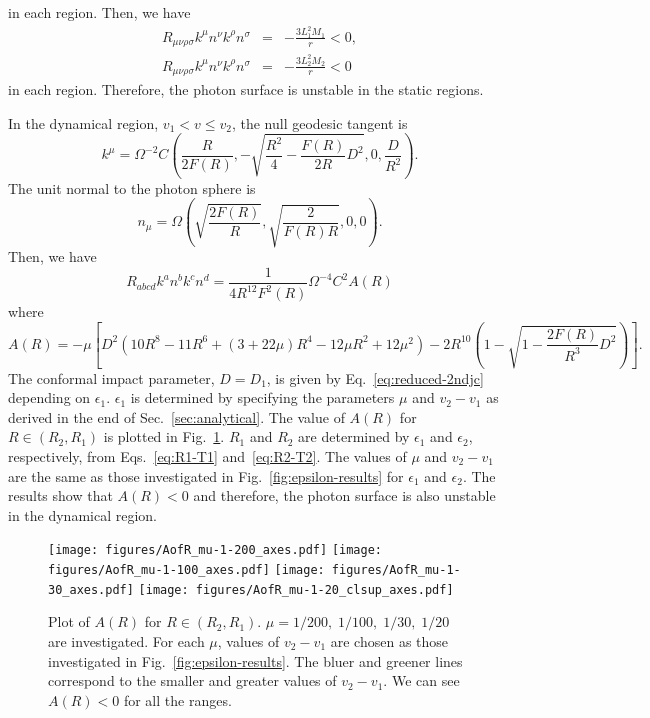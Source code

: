 \documentclass[prd,showpacs,preprintnumbers,groupedaddress,superscriptaddress,nofootinbib,11pt]{revtex4-1} %
\theoremstyle{newplain}
\begin{document}
in each region.
Then, we have
\begin{eqnarray}
R_{\mu\nu\rho\sigma}k^\mu n^\nu k^\rho n^\sigma&=&-\frac{3L_1^2M_1}{r}<0,\nonumber\\
R_{\mu\nu\rho\sigma}k^\mu n^\nu k^\rho n^\sigma&=&-\frac{3L_2^2M_2}{r}<0
\end{eqnarray}
in each region.
Therefore, the photon surface is unstable in the static regions.
\par
In the dynamical region, $v_1<v\leq v_2$, the null geodesic tangent is
\begin{equation}
k^\mu=\Omega^{-2}C\left(\frac{R}{2F(R)},-\sqrt{\frac{R^2}{4}-\frac{F(R)}{2R}D^2},0,\frac{D}{R^2}\right).
\end{equation}
The unit normal to the photon sphere is
\begin{equation}
n_\mu=\Omega\left(\sqrt{\frac{2F(R)}{R}},\sqrt{\frac{2}{F(R)R}},0,0\right).
\end{equation}
Then, we have
\begin{equation}
R_{abcd}k^an^bk^cn^d=\frac{1}{4R^{12}F^2(R)}\Omega^{-4}C^2A(R)
\end{equation}
where
\begin{equation}
A(R)=-\mu \left[D^2\left(10R^8-11R^6+(3+22\mu)R^4-12\mu R^2+12\mu^2\right)
-2R^{10}\left(1-\sqrt{1-\frac{2F(R)}{R^3}D^2}\right)\right].
\end{equation}
The conformal impact parameter, $D=D_1$, is given by Eq.~\eqref{eq:reduced-2ndjc} depending on $\epsilon_1$.
$\epsilon_1$ is determined by specifying the parameters $\mu$ and $v_2-v_1$ as derived in the end of Sec.~\ref{sec:analytical}.
The value of $A(R)$ for $R\in(R_2,R_1)$ is plotted in Fig.~\ref{fig:AofR}.
$R_1$ and $R_2$ are determined by $\epsilon_1$ and $\epsilon_2$, respectively, from Eqs.~\eqref{eq:R1-T1} and~\eqref{eq:R2-T2}.
The values of $\mu$ and $v_2-v_1$ are the same as those investigated in Fig.~\ref{fig:epsilon-results} for $\epsilon_1$ and $\epsilon_2$.
The results show that $A(R)<0$ and therefore, the photon surface is also unstable in the dynamical region.
\begin{figure}[h]
\centering
\texttt{[image: figures/AofR\_mu-1-200\_axes.pdf]}
\texttt{[image: figures/AofR\_mu-1-100\_axes.pdf]}
\texttt{[image: figures/AofR\_mu-1-30\_axes.pdf]}
\texttt{[image: figures/AofR\_mu-1-20\_clsup\_axes.pdf]}
\caption{
\label{fig:AofR} 
Plot of $A(R)$ for $R\in(R_2,R_1)$.
$\mu=1/200,\;1/100,\;1/30,\;1/20$ are investigated.
For each $\mu$, values of $v_2-v_1$ are chosen as those investigated in Fig.~\ref{fig:epsilon-results}.
The bluer and greener lines correspond to the smaller and greater values of $v_2-v_1$.
We can see $A(R)<0$ for all the ranges.
}
\end{figure}
\end{document}
